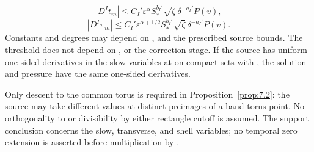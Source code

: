 \begin{proposition}
\begin{equation}
|D^It_m|\leq C_I'\varepsilon^\alpha S_*^{b_I'}\sqrt{\zeta}\,\delta^{-a_I'}P(v),
\tag{7.14}\label{eq:7.14}
\end{equation}
\begin{equation}
|D^I\pi_m|\leq C_I'\varepsilon^{\alpha+1/2}S_*^{b_I'}\sqrt{\zeta}\,\delta^{-a_I'}P(v).
\tag{7.15}\label{eq:7.15}
\end{equation}
Constants and degrees may depend on , and the prescribed source bounds. The threshold 
does not depend on , or the correction stage. If the source has uniform one-sided derivatives in
the slow variables at  on compact sets with , the solution and pressure have the same
one-sided derivatives.
\end{proposition}

Only descent to the common torus  is required in Proposition~\ref{prop:7.2}: the source may take
different values at distinct preimages of a band-torus point. No orthogonality to  or
divisibility by either rectangle cutoff is assumed. The support conclusion concerns the slow,
transverse, and shell variables; no temporal zero extension is asserted before multiplication
by .


